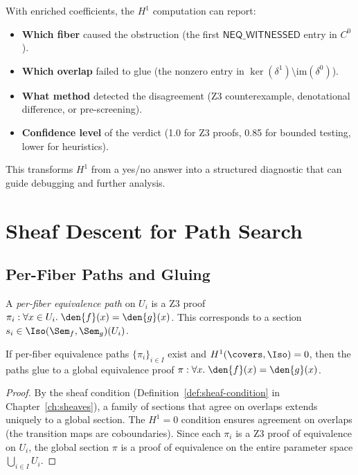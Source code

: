 With enriched coefficients, the $H^1$ computation can report:
\begin{itemize}
  \item \textbf{Which fiber} caused the obstruction (the first
    $\mathsf{NEQ\_WITNESSED}$ entry in $C^0$).
  \item \textbf{Which overlap} failed to glue (the nonzero entry
    in $\ker(\delta^1) \setminus \mathrm{im}(\delta^0)$).
  \item \textbf{What method} detected the disagreement (Z3
    counterexample, denotational difference, or pre-screening).
  \item \textbf{Confidence level} of the verdict (1.0 for Z3
    proofs, 0.85 for bounded testing, lower for heuristics).
\end{itemize}

This transforms $H^1$ from a yes/no answer into a structured
diagnostic that can guide debugging and further analysis.


\section{Sheaf Descent for Path Search}
\label{sec:sheaf-descent}

\subsection{Per-Fiber Paths and Gluing}

\begin{definition}
\label{def:per-fiber-path}
A \emph{per-fiber equivalence path} on $U_i$ is a Z3 proof
$\pi_i : \forall x \in U_i.\; \den{f}(x) = \den{g}(x)$.
This corresponds to a section $s_i \in \Iso(\Sem_f, \Sem_g)(U_i)$.
\end{definition}

\begin{theorem}
\label{thm:descent-eq}
If per-fiber equivalence paths $\{\pi_i\}_{i \in I}$ exist and
$H^1(\covers, \Iso) = 0$, then the paths glue to a global
equivalence proof $\pi : \forall x.\; \den{f}(x) = \den{g}(x)$.
\end{theorem}

\begin{proof}
By the sheaf condition (Definition~\ref{def:sheaf-condition} in
Chapter~\ref{ch:sheaves}), a family of sections that agree on
overlaps extends uniquely to a global section.  The $H^1 = 0$
condition ensures agreement on overlaps (the transition maps are
coboundaries).  Since each $\pi_i$ is a Z3 proof of equivalence
on $U_i$, the global section $\pi$ is a proof of equivalence on
the entire parameter space $\bigcup_{i \in I} U_i$.
\end{proof}

